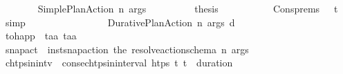 \begin{isabellebody}
\ \ \ \ \ \ \isamarkupfalse%
\ {\isacharparenleft}{\kern0pt}Simple{\isacharunderscore}{\kern0pt}Plan{\isacharunderscore}{\kern0pt}Action\ n\ args{\isacharparenright}{\kern0pt}\isanewline
\ \ \ \ \ \ \isamarkupfalse%
\ \isamarkupfalse%
\ {\isacharquery}{\kern0pt}thesis\ \isanewline
\ \ \ \ \ \ \ \ \isamarkupfalse%
\ Cons{\isachardot}{\kern0pt}prems\ {\isacartoucheopen}{\isasympi}\ {\isacharequal}{\kern0pt}\ {\isacharparenleft}{\kern0pt}t\isactrlsub {\isasympi}{\isacharcomma}{\kern0pt}{\isasympi}{\isacharprime}{\kern0pt}{\isacharparenright}{\kern0pt}{\isacartoucheclose}\ \isamarkupfalse%
\ simp\isanewline
\ \ \ \ \ \ \isamarkupfalse%
\isanewline
\ \ \ \ \ \ \ \ \isamarkupfalse%
\ {\isacharparenleft}{\kern0pt}Durative{\isacharunderscore}{\kern0pt}Plan{\isacharunderscore}{\kern0pt}Action\ n\ args\ d{\isacharparenright}{\kern0pt}\isanewline
\ \ \ \ \ \ \ \ \isamarkupfalse%
\ {\isacharquery}{\kern0pt}to{\isacharunderscore}{\kern0pt}happ\ {\isacharequal}{\kern0pt}\ {\isachardoublequoteopen}{\isasymlambda}{\isacharparenleft}{\kern0pt}t\isactrlsub a{\isacharcomma}{\kern0pt}a{\isacharparenright}{\kern0pt}{\isachardot}{\kern0pt}\ {\isacharparenleft}{\kern0pt}t\isactrlsub a{\isacharcomma}{\kern0pt}{\isacharbrackleft}{\kern0pt}a{\isacharbrackright}{\kern0pt}{\isacharparenright}{\kern0pt}{\isachardoublequoteclose}\isanewline
\ \ \ \ \ \ \ \ \isamarkupfalse%
\ {\isacharquery}{\kern0pt}snap{\isacharunderscore}{\kern0pt}act\ {\isacharequal}{\kern0pt}\ {\isachardoublequoteopen}inst{\isacharunderscore}{\kern0pt}snap{\isacharunderscore}{\kern0pt}action\ {\isacharparenleft}{\kern0pt}the\ {\isacharparenleft}{\kern0pt}resolve{\isacharunderscore}{\kern0pt}action{\isacharunderscore}{\kern0pt}schema\ n{\isacharparenright}{\kern0pt}{\isacharparenright}{\kern0pt}\ args{\isachardoublequoteclose}\isanewline
\ \ \ \ \ \ \ \ \isamarkupfalse%
\ {\isacharquery}{\kern0pt}chtps{\isacharunderscore}{\kern0pt}in{\isacharunderscore}{\kern0pt}intv\ {\isacharequal}{\kern0pt}\ {\isachardoublequoteopen}consec{\isacharunderscore}{\kern0pt}htps{\isacharunderscore}{\kern0pt}in{\isacharunderscore}{\kern0pt}interval\ htps\ t\isactrlsub {\isasympi}\ {\isacharparenleft}{\kern0pt}t\isactrlsub {\isasympi}\ {\isacharplus}{\kern0pt}\ duration\ {\isasympi}{\isacharprime}{\kern0pt}{\isacharparenright}{\kern0pt}{\isachardoublequoteclose}\isanewline
\ \ \ \ \ \ \ \ \isamarkupfalse%

\end{isabellebody}

